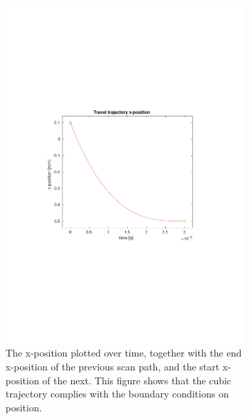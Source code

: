 \begin{figure}[hp]
\begin{subfigure}{0.72\textwidth}
        \includegraphics[clip, trim=3.5cm 9cm 4cm 9cm, width=\textwidth]{Pictures/3-traj-pos.pdf}
        \caption{The x-position plotted over time, together with the end x-position of the previous scan path, and the start x-position of the next. This figure shows that the cubic trajectory complies with the boundary conditions on position.}
        \label{fig:3-traj-pos-t}
    \end{subfigure}
    \caption{}
    \label{fig:3-traj-pos}
\end{figure}

